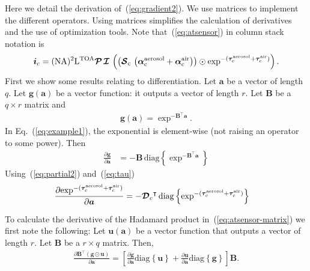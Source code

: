\documentclass[10pt,twocolumn,letterpaper]{article}
\newcommand{\OpSphere}{\bm{\mathcal{S}}}
\newcommand{\OpDistance}{\bm{\mathcal{D}}}
\newcommand{\OpInt}{\bm{\mathcal{I}}}
\newcommand{\OpCamera}{\bm{\mathcal{P}}}
\newcommand{\OpDiag}[1]{\mathrm{diag}\left\{#1\right\}}
\newcommand{\roundy}[1]{\left(#1\right)}
\newcommand{\PartDeriv}[2]{\frac{\partial{#1}}{\partial{#2}}}
\newcommand{\vect}[1]{\bm{#1}}
\newcommand{\mat}[1]{\bm{#1}}
\newcommand{\transpose}[1]{{#1}^\intercal}
\begin{document}
Here we detail the derivation of~(\ref{eq:gradient2}).  We use
matrices to implement the different operators. Using matrices
simplifies the calculation of derivatives and the use of optimization
tools. Note that~(\ref{eq:atsensor}) in column stack notation is
\begin{align}
  \vect{i}_c=(\rm{NA})^2\mathrm{L}^{\rm TOA} \OpCamera \, \OpInt \,
  \roundy{ \roundy {\OpSphere_c \, \roundy{\vect{\alpha}^{\rm
          aerosol}_c + \vect{\alpha}^{\rm air}_c} } \odot
    \exp^{-(\vect{\tau}^{\rm aerosol}_c + \vect{\tau}^{\rm air}_c)}}.
  \label{eq:atsensor-matrix}
\end{align}
First we show some results relating to differentiation. Let $\vect{a}$
be a vector of length $q$. Let $\vect{g}(\vect{a})$ be a vector
function: it outputs a vector of length $r$. Let $\mat{B}$ be a $q
\times r$ matrix and
\begin{align}
  \vect{g}(\vect{a}) = \exp^{-\transpose{\mat{B}}\vect{a}}.
  \label{eq:example1}
\end{align}
In Eq.~(\ref{eq:example1}), the exponential is element-wise (not
raising an operator to some power). Then
\begin{align}
  \label{eq:partial2}
  \PartDeriv{\vect{g}}{\vect{a}} &= - \mat{B} \,
  \OpDiag{\exp^{-\transpose{\mat{B}}\vect{a}}}
\end{align}
Using~(\ref{eq:partial2}) and~(\ref{eq:tau})
\begin{align}
  \label{eq:partial4}
  \PartDeriv{\exp^{-(\vect{\tau}^{\rm aerosol}_c + \vect{\tau}^{\rm
        air}_c)}}{\vect{a}} &= - \transpose{\OpDistance_c} \,
  \OpDiag{\exp^{-(\vect{\tau}^{\rm aerosol}_c + \vect{\tau}^{\rm
        air}_c)}}
\end{align}

To calculate the derivative of the Hadamard product
in~(\ref{eq:atsensor-matrix}) we first note the following: Let
$\vect{u}(\vect{a})$ be a vector function that outputs a vector of
length $r$. Let $\mat{B}$ be a $r \times q$ matrix. Then,
\begin{align}
  \label{eq:partial1}
  \PartDeriv{\transpose{\mat{B}} (\vect{g} \odot \vect{u})}{\vect{a}}
  = \left[ \PartDeriv{\vect{g}}{\vect{a}} \OpDiag{\vect{u}} +
    \PartDeriv{\vect{u}}{\vect{a}} \OpDiag{\vect{g}} \right]
  \mat{B}.
\end{align}
%
%
\end{document}
